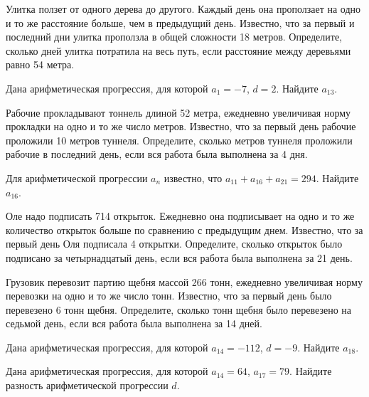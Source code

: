 \documentclass[4apaper]{article}
\begin{document}
\begin{taskBN}{8}
 Улитка ползет от одного дерева до другого. Каждый день она проползает на одно и то же расстояние больше, чем в предыдущий день. Известно, что за первый и последний дни улитка проползла в общей сложности 18 метров. Определите, сколько дней улитка потратила на весь путь, если расстояние между деревьями равно 54 метра.
\end{taskBN}

\begin{taskBN}{9}
Дана арифметическая прогрессия, для которой $a_1 = -7$, $d=2$. Найдите $a_{13}$.
\end{taskBN}

\begin{taskBN}{10}
 Рабочие прокладывают тоннель длиной 52 метра, ежедневно увеличивая норму прокладки на одно и то же число метров. Известно, что за первый день рабочие проложили 10 метров туннеля.  Определите, сколько метров туннеля проложили рабочие в последний день, если вся работа была выполнена за 4 дня.
\end{taskBN}

\begin{taskBN}{11}
Для арифметической прогрессии ${a_n}$ известно, что $a_{11} + a_{16} + a_{21}= 294$. Найдите $a_{16}$.
\end{taskBN}

\begin{taskBN}{12}
Оле надо подписать 714 открыток. Ежедневно она подписывает на одно и то же количество открыток больше по сравнению с предыдущим днем. Известно, что за первый день Оля подписала 4 открытки. Определите, сколько открыток было подписано за четырнадцатый день, если вся работа была выполнена за 21 день.
\end{taskBN}

\begin{taskBN}{13}
Грузовик перевозит партию щебня массой 266 тонн, ежедневно увеличивая норму перевозки на одно и то же число тонн. Известно, что за первый день было перевезено 6 тонн щебня. Определите, сколько тонн щебня было перевезено на седьмой день, если вся работа была выполнена за 14 дней.
\end{taskBN}

\begin{taskBN}{14}
Дана арифметическая прогрессия, для которой $a_{14} = -112$, $d=-9$. Найдите $a_{18}$.
\end{taskBN}

\begin{taskBN}{15}
Дана арифметическая прогрессия, для которой $a_{14} = 64$, $a_{17} = 79$. Найдите разность арифметической прогрессии $d$.
\end{taskBN}
\end{document}
